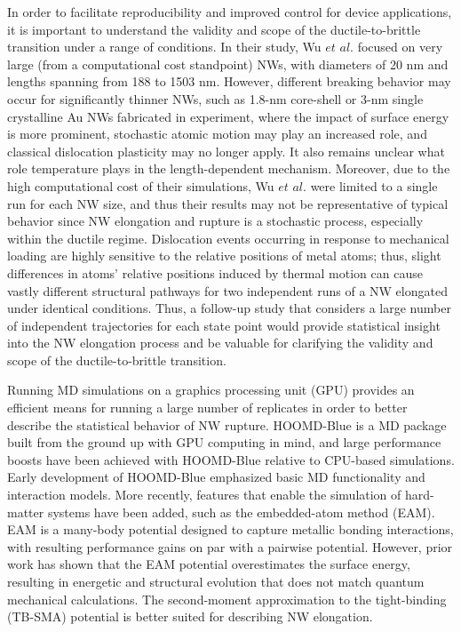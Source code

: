 \documentclass[10pt]{report}  %
\begin{document}
In order to facilitate reproducibility and improved control for device applications, it is important to understand the validity and scope of the ductile-to-brittle transition under a range of conditions. In their study, Wu $et$ $al.$ \cite{Wu:2012} focused on very large (from a computational cost standpoint) NWs, with diameters of 20 nm and lengths spanning from 188 to 1503 nm. However, different breaking behavior may occur for significantly thinner NWs, such as 1.8-nm core-shell \cite{Oshima:2003} or 3-nm single crystalline \cite{Lu:2010} Au NWs fabricated in experiment, where the impact of surface energy is more prominent, stochastic atomic motion may play an increased role, and classical dislocation plasticity may no longer apply. It also remains unclear what role temperature plays in the length-dependent mechanism. Moreover, due to the high computational cost of their simulations, Wu $et$ $al.$ \cite{Wu:2012} were limited to a single run for each NW size, and thus their results may not be representative of typical behavior since NW elongation and rupture is a stochastic process,\cite{Pu:2008,French:2011,Iacovella:2011} especially within the ductile regime. Dislocation events occurring in response to mechanical loading are highly sensitive to the relative positions of metal atoms; thus, slight differences in atoms' relative positions induced by thermal motion can cause vastly different structural pathways for two independent runs of a NW elongated under identical conditions. Thus, a follow-up study that considers a large number of independent trajectories for each state point would provide statistical insight into the NW elongation process and be valuable for clarifying the validity and scope of the ductile-to-brittle transition.

Running MD simulations on a graphics processing unit (GPU) provides an efficient means for running a large number of replicates in order to better describe the statistical behavior of NW rupture. HOOMD-Blue is a MD package built from the ground up with GPU computing in mind, and large performance boosts have been achieved with HOOMD-Blue relative to CPU-based simulations.\cite{Anderson:2008} Early development of HOOMD-Blue emphasized basic MD functionality and interaction models. More recently, features that enable the simulation of hard-matter systems have been added, such as the embedded-atom method (EAM).\cite{Morozov:2011} EAM is a many-body potential designed to capture metallic bonding interactions, with resulting performance gains on par with a pairwise potential. However, prior work \cite{Pu_JCP:2007} has shown that the EAM potential overestimates the surface energy, resulting in energetic and structural evolution that does not match quantum mechanical calculations. The second-moment approximation to the tight-binding (TB-SMA) potential is better suited for describing NW elongation.\cite{Pu_JCP:2007} 
\end{document}
